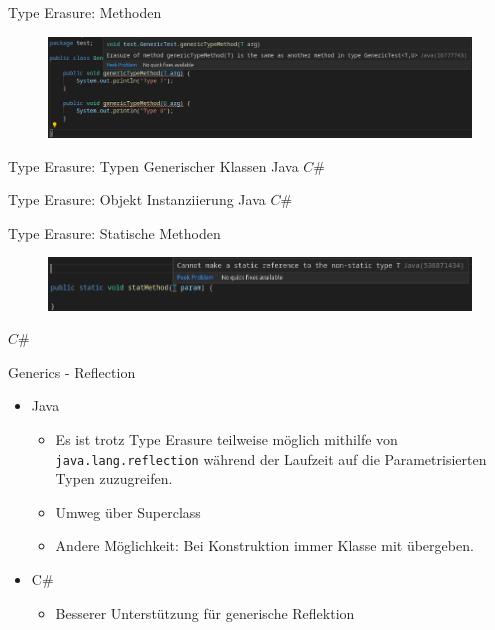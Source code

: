 \documentclass[11pt]{beamer}
\begin{document}
\begin{frame}{Type Erasure: Methoden}
	\begin{figure}
		\includegraphics[width=\textwidth]{bilder/java_type_erasure.png}
	\end{figure}
\end{frame}

\begin{frame}{Type Erasure: Typen Generischer Klassen}
	Java
	$C\#$
\end{frame}

\begin{frame}{Type Erasure: Objekt Instanziierung}
	Java
	$C\#$
\end{frame}

\begin{frame}{Type Erasure: Statische Methoden}
	\begin{figure}
		\includegraphics[width=\textwidth]{bilder/java_no_static_methods.png}
	\end{figure}
	
	$C\#$
\end{frame}

\begin{frame}{Generics - Reflection}
\begin{itemize}
	\item Java 
	\begin{itemize}
		\item Es ist trotz Type Erasure teilweise möglich mithilfe von \texttt{java.lang.reflection} während der Laufzeit auf die Parametrisierten Typen zuzugreifen. 
		\item \glqq Umweg\grqq{} über Superclass
		\item Andere Möglichkeit: Bei Konstruktion immer Klasse mit übergeben.
	\end{itemize}
	\item C\# 
	\begin{itemize}
		\item Besserer Unterstützung für generische Reflektion
	\end{itemize}
\end{itemize}
\end{frame}
\end{document}
